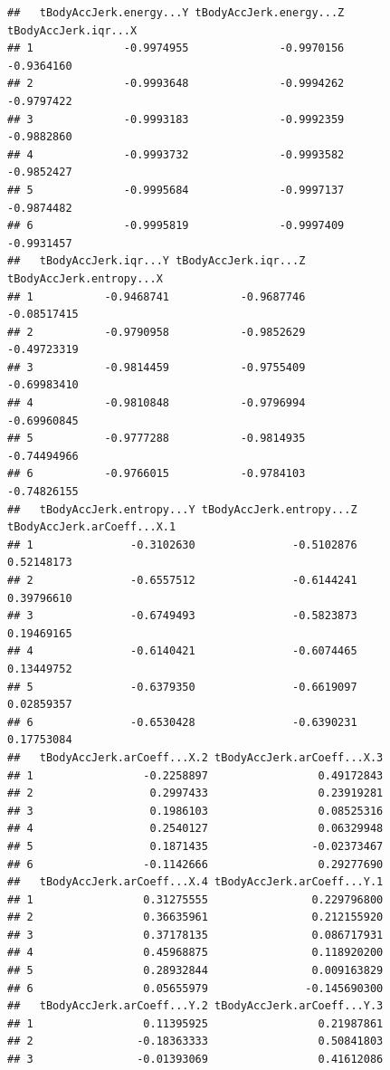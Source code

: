 \documentclass[
]{article}
\begin{document}
\begin{verbatim}
##   tBodyAccJerk.energy...Y tBodyAccJerk.energy...Z tBodyAccJerk.iqr...X
## 1              -0.9974955              -0.9970156           -0.9364160
## 2              -0.9993648              -0.9994262           -0.9797422
## 3              -0.9993183              -0.9992359           -0.9882860
## 4              -0.9993732              -0.9993582           -0.9852427
## 5              -0.9995684              -0.9997137           -0.9874482
## 6              -0.9995819              -0.9997409           -0.9931457
##   tBodyAccJerk.iqr...Y tBodyAccJerk.iqr...Z tBodyAccJerk.entropy...X
## 1           -0.9468741           -0.9687746              -0.08517415
## 2           -0.9790958           -0.9852629              -0.49723319
## 3           -0.9814459           -0.9755409              -0.69983410
## 4           -0.9810848           -0.9796994              -0.69960845
## 5           -0.9777288           -0.9814935              -0.74494966
## 6           -0.9766015           -0.9784103              -0.74826155
##   tBodyAccJerk.entropy...Y tBodyAccJerk.entropy...Z tBodyAccJerk.arCoeff...X.1
## 1               -0.3102630               -0.5102876                 0.52148173
## 2               -0.6557512               -0.6144241                 0.39796610
## 3               -0.6749493               -0.5823873                 0.19469165
## 4               -0.6140421               -0.6074465                 0.13449752
## 5               -0.6379350               -0.6619097                 0.02859357
## 6               -0.6530428               -0.6390231                 0.17753084
##   tBodyAccJerk.arCoeff...X.2 tBodyAccJerk.arCoeff...X.3
## 1                 -0.2258897                 0.49172843
## 2                  0.2997433                 0.23919281
## 3                  0.1986103                 0.08525316
## 4                  0.2540127                 0.06329948
## 5                  0.1871435                -0.02373467
## 6                 -0.1142666                 0.29277690
##   tBodyAccJerk.arCoeff...X.4 tBodyAccJerk.arCoeff...Y.1
## 1                 0.31275555                0.229796800
## 2                 0.36635961                0.212155920
## 3                 0.37178135                0.086717931
## 4                 0.45968875                0.118920200
## 5                 0.28932844                0.009163829
## 6                 0.05655979               -0.145690300
##   tBodyAccJerk.arCoeff...Y.2 tBodyAccJerk.arCoeff...Y.3
## 1                 0.11395925                 0.21987861
## 2                -0.18363333                 0.50841803
## 3                -0.01393069                 0.41612086

\end{verbatim}
\end{document}
